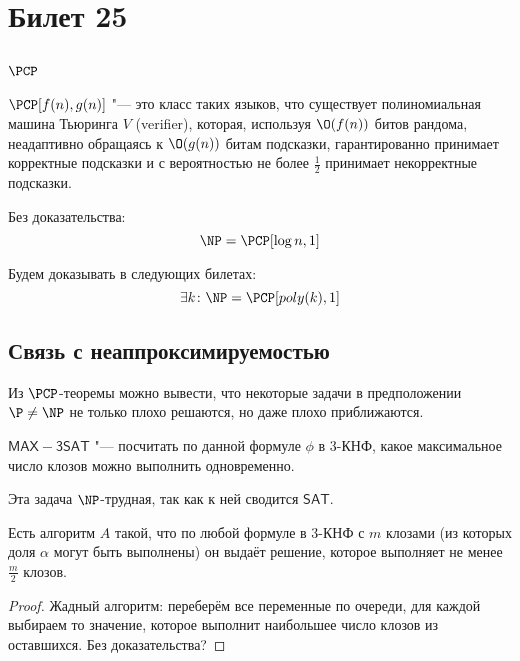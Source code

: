 \setcounter{section}{24}
\section{Билет 25}
\subsection[PCP]{$\PCP$}
	\begin{Def}
		$\PCP[f(n), g(n)]$ "--- это класс таких языков, что существует полиномиальная машина Тьюринга $V$ (verifier),
		которая, используя $\O(f(n))$ битов рандома, неадаптивно обращаясь к $\O(g(n))$ битам подсказки, гарантированно принимает
		корректные подсказки и с вероятностью не более $\frac 12$ принимает некорректные подсказки.
	\end{Def}
	\begin{theorem}
		Без доказательства:
		\[ \NP = \PCP[\log n, 1] \]
	\end{theorem}
	\begin{theorem}
		Будем доказывать в следующих билетах:
		\[ \exists k \colon \NP = \PCP[poly(k), 1] \]
	\end{theorem}

\subsection{Связь с неаппроксимируемостью}
	Из $\PCP$-теоремы можно вывести, что некоторые задачи в предположении $\P\neq \NP$ не только плохо решаются,
	но даже плохо приближаются.

	\begin{Def}
		$\mathsf{MAX-3SAT}$ "--- посчитать по данной формуле $\phi$ в 3-КНФ, какое максимальное число клозов можно выполнить одновременно.
	\end{Def}
	\begin{Rem}
		Эта задача $\NP$-трудная, так как к ней сводится $\mathsf{SAT}$.
	\end{Rem}

	\begin{assertion}
		Есть алгоритм $A$ такой, что по любой формуле в 3-КНФ с $m$ клозами (из которых доля $\alpha$ могут быть выполнены)
		он выдаёт решение, которое выполняет не менее $\frac{m}{2}$ клозов.
	\end{assertion}
	\begin{proof}
		Жадный алгоритм: переберём все переменные по очереди, для каждой выбираем то значение, которое выполнит наибольшее число клозов из оставшихся.
		Без доказательства? \TODO
	\end{proof}

